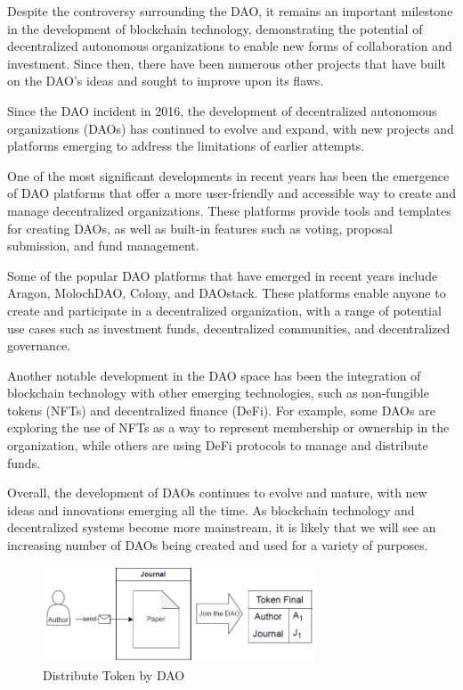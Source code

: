 \documentclass[lettersize,journal]{IEEEtran}
\begin{document}
Despite the controversy surrounding the DAO, it remains an important milestone in the development of blockchain technology, demonstrating the potential of decentralized autonomous organizations to enable new forms of collaboration and investment. Since then, there have been numerous other projects that have built on the DAO's ideas and sought to improve upon its flaws.

Since the DAO incident in 2016, the development of decentralized autonomous organizations (DAOs) has continued to evolve and expand, with new projects and platforms emerging to address the limitations of earlier attempts.

One of the most significant developments in recent years has been the emergence of DAO platforms that offer a more user-friendly and accessible way to create and manage decentralized organizations. These platforms provide tools and templates for creating DAOs, as well as built-in features such as voting, proposal submission, and fund management.

Some of the popular DAO platforms that have emerged in recent years include Aragon, MolochDAO, Colony, and DAOstack. These platforms enable anyone to create and participate in a decentralized organization, with a range of potential use cases such as investment funds, decentralized communities, and decentralized governance.


Another notable development in the DAO space has been the integration of blockchain technology with other emerging technologies, such as non-fungible tokens (NFTs) and decentralized finance (DeFi). For example, some DAOs are exploring the use of NFTs as a way to represent membership or ownership in the organization, while others are using DeFi protocols to manage and distribute funds.

Overall, the development of DAOs continues to evolve and mature, with new ideas and innovations emerging all the time. As blockchain technology and decentralized systems become more mainstream, it is likely that we will see an increasing number of DAOs being created and used for a variety of purposes.


\begin{figure}[h]
  \centering
  \includegraphics[width=3.2in]{assets/daopaper.png}
  \caption{Distribute Token by DAO}
\end{figure}
\end{document}
